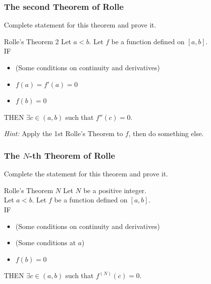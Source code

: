 \begin{frame}[t]
	\frametitle{The second Theorem of Rolle}

	Complete statement for this theorem and prove it.

	\vfill

	\begin{block}{Rolle's Theorem 2}
		Let $a<b$. Let $f$ be a function defined on $[a,b]$. \\ IF
		\begin{itemize}
			\item (Some conditions on continuity and derivatives)

			\item $\displaystyle f(a) = f'(a) =0$

			\item $\displaystyle f(b)=0$
		\end{itemize}
		THEN $\displaystyle \exists c \in (a,b)$ such that $\displaystyle f''(c)=0$.
	\end{block}

	\vfill

	\emph{Hint:} Apply the 1st Rolle's Theorem to $f$, then do something else.
\end{frame}

\begin{frame}[t]
	\frametitle{The $N$-th Theorem of Rolle}

	Complete the statement for this theorem and prove it.

	\begin{block}{Rolle's Theorem $N$}
		Let $N$ be a positive integer. \\ Let $a<b$. Let $f$ be a function defined on
		$[a,b]$. \\ IF
		\begin{itemize}
			\item (Some conditions on continuity and derivatives)

			\item (Some conditions at $a$)

			\item $\displaystyle f(b)=0$
		\end{itemize}
		THEN $\displaystyle \exists c \in (a,b)$ such that
		$\displaystyle f^{(N)}(c)=0$.
	\end{block}
\end{frame}

